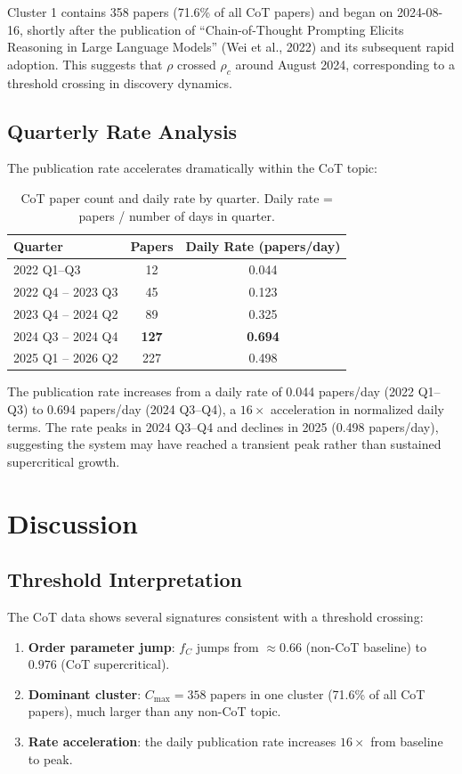 \documentclass[12pt]{article}
\begin{document}
Cluster 1 contains 358 papers (71.6\% of all CoT papers) and began on 2024-08-16, shortly after the publication of ``Chain-of-Thought Prompting Elicits Reasoning in Large Language Models'' (Wei et al., 2022) and its subsequent rapid adoption. This suggests that $\rho$ crossed $\rho_c$ around August 2024, corresponding to a threshold crossing in discovery dynamics.

\subsection{Quarterly Rate Analysis}

The publication rate accelerates dramatically within the CoT topic:

\begin{table}[htbp]
  \centering
  \begin{tabular}{lcc}
    \toprule
    Quarter & Papers & Daily Rate (papers/day) \\
    \midrule
    2022 Q1--Q3 & 12 & 0.044 \\
    2022 Q4 -- 2023 Q3 & 45 & 0.123 \\
    2023 Q4 -- 2024 Q2 & 89 & 0.325 \\
    2024 Q3 -- 2024 Q4 & \textbf{127} & \textbf{0.694} \\
    2025 Q1 -- 2026 Q2 & 227 & 0.498 \\
    \bottomrule
  \end{tabular}
  \caption{CoT paper count and daily rate by quarter. Daily rate = papers / number of days in quarter.}
  \label{tab:quarterly}
\end{table}

The publication rate increases from a daily rate of 0.044 papers/day (2022 Q1--Q3) to 0.694 papers/day (2024 Q3--Q4), a $16\times$ acceleration in normalized daily terms. The rate peaks in 2024 Q3--Q4 and declines in 2025 (0.498 papers/day), suggesting the system may have reached a transient peak rather than sustained supercritical growth.

\section{Discussion}

\subsection{Threshold Interpretation}

The CoT data shows several signatures consistent with a threshold crossing:
\begin{enumerate}
    \item \textbf{Order parameter jump}: $f_C$ jumps from $\approx 0.66$ (non-CoT baseline) to $0.976$ (CoT supercritical).
    \item \textbf{Dominant cluster}: $C_{\max} = 358$ papers in one cluster (71.6\% of all CoT papers), much larger than any non-CoT topic.
    \item \textbf{Rate acceleration}: the daily publication rate increases $16\times$ from baseline to peak.
\end{enumerate}
\end{document}

